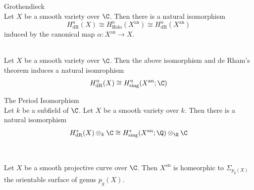 \documentclass[a4paper]{article}
\begin{document}
\begin{thm}{Grothendieck}{}\\
Let $X$ be a smooth variety over $\C$. Then there is a natural isomorphism $$H_\text{dR}^n(X)\cong H_\text{Holo}^n(X^\text{an})\cong H_\text{dR}^n(X^\text{an})$$ induced by the canonical map $\alpha:X^\text{an}\to X$. 
\end{thm}

\begin{crl}{}{}\\
Let $X$ be a smooth variety over $\C$. Then the above isomorphism and de Rham's theorem induces a natural isomrophism $$H_\text{dR}^n(X)\cong H_\text{sing}^n(X^\text{an};\C)$$
\end{crl}

\begin{thm}{The Period Isomorphism}{}\\
Let $k$ be a subfield of $\C$. Let $X$ be a smooth variety over $k$. Then there is a natural isomorphism $$H_\text{dR}^\ast(X)\otimes_k\C\cong H_\text{sing}^\ast(X^\text{an};\Q)\otimes_\Q\C$$
\end{thm}

\subsection{}
\begin{prp}{}{}\\
Let $X$ be a smooth projective curve over $\C$. Then $X^\text{an}$ is homeorphic to $\Sigma_{p_g(X)}$ the orientable surface of genus $p_g(X)$. 
\end{prp}
\end{document}
